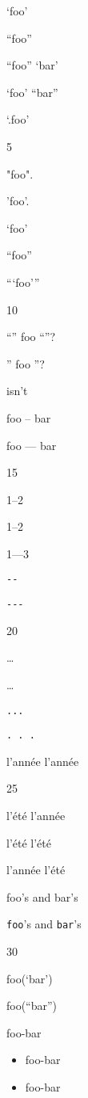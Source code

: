 
\def\mytitle{Smart Quotes}


`foo'

``foo''

``foo'' `bar'

`foo' ``bar''

`.foo'

5

"foo".

'foo'.

`foo'

``foo''

```foo'''

10

``'' foo ``''?

'' foo ''?

isn't

foo -- bar

foo --- bar

15

1--2

1--2

1---3

\texttt{-{}-}

\texttt{-{}-{}-}

20

{\ldots}

{\ldots}

\texttt{...}

\texttt{. . .}

l'année l'année

25

l'été l'année

l'été l'été

l'année l'été

foo's and bar's

\texttt{foo}'s and \texttt{bar}'s

30

foo(`bar')

foo(``bar'')

foo-bar

\begin{itemize}
\item foo-bar

\item foo-bar

\end{itemize}



